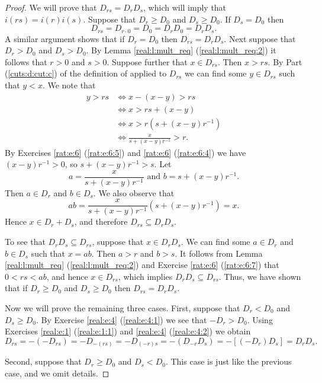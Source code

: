 \begin{proof}
	We will prove that $D_{r s} = D_r D_s$, which will imply that $i(r s) = i(r) i(s)$. Suppose that $D_r \geq D_0$ and $D_s \geq D_0$. If $D_s = D_0$ then
	$$
		D_{r s} = D_{r \cdot 0} = D_0 = D_r D_0 = D_r D_s.
	$$
	A similar argument shows that if $D_r = D_0$ then $D_{r s} = D_r D_s$. Next suppose that $D_r > D_0$ and $D_s > D_0$. By Lemma \ref{real:l:mult_req} (\ref{real:l:mult_req:2}) it follows that $r > 0$ and $s > 0$. Suppose further that $x \in D_{r s}$. Then $x > r s$. By Part (\ref{cuts:d:cut:c}) of the definition of  applied to $D_{r s}$ we can find some $y \in D_{r s}$ such that $y < x$. We note that
	\begin{align*}
		y > rs & \iff x - (x - y) > rs                        \\
		       & \iff x > rs + (x - y)                        \\
		       & \iff x > r \left( s + (x - y) r^{-1} \right) \\
		       & \iff \frac{x}{s + (x - y) r^{-1}} > r.
	\end{align*}
	By Exercises \ref{rat:e:6} (\ref{rat:e:6:5}) and \ref{rat:e:6} (\ref{rat:e:6:4}) we have $(x - y) r^{-1} > 0$, so $s + (x - y) r^{-1} > s$. Let
	$$
		a = \frac{x}{s + (x - y) r^{-1}} \text{ and } b = s + (x - y) r^{-1}.
	$$
	Then $a \in D_r$ and $b \in D_s$. We also observe that
	$$
		a b = \frac{x}{s + (x - y) r^{-1}} \left( s + (x - y) r^{-1} \right) = x.
	$$
	Hence $x \in D_r + D_s$, and therefore $D_{r s} \subseteq D_r D_s$.

	To see that $D_r D_s \subseteq D_{r s}$, suppose that $x \in D_r D_s$. We can find some $a \in D_r$ and $b \in D_s$ such that ${x = a b}$. Then $a > r$ and $b > s$. It follows from Lemma \ref{real:l:mult_req} (\ref{real:l:mult_req:2}) and Exercise \ref{rat:e:6} (\ref{rat:e:6:7}) that $0 < r s < a b$, and hence $x \in D_{r s}$, which implies $D_r D_s \subseteq D_{r s}$. Thus, we have shown that if $D_r \geq D_0$ and $D_s \geq D_0$ then $D_{r s} = D_r D_s$.

	Now we will prove the remaining three cases. First, suppose that $D_r < D_0$ and ${D_s \geq D_0}$. By Exercise \ref{real:e:4} (\ref{real:e:4:1}) we see that $-D_r > D_0$. Using Exercises \ref{real:e:1} (\ref{real:e:1:1}) and \ref{real:e:4} (\ref{real:e:4:2}) we obtain
	$$
		D_{r s} = -(-D_{r s}) = -D_{-(r s)} = -D_{(-r) s} = -(D_{-r} D_s) = -[(-D_r) D_s] = D_r D_s.
	$$

	Second, suppose that $D_r \geq D_0$ and $D_s < D_0$. This case is just like the previous case, and we omit details.


\end{proof}
